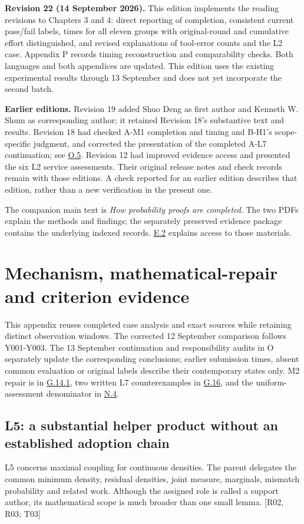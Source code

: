 \textbf{Revision 22 (14 September 2026).} This edition implements the reading revisions to Chapters 3 and 4: direct reporting of completion, consistent current pass/fail labels, times for all eleven groups with original-round and cumulative effort distinguished, and revised explanations of tool-error counts and the L2 case. Appendix P records timing reconstruction and comparability checks. Both languages and both appendices are updated. This edition uses the existing experimental results through 13 September and does not yet incorporate the second batch.

\textbf{Earlier editions.} Revision 19 added Shuo Deng as first author and Kenneth W. Shum as corresponding author; it retained Revision 18's substantive text and results. Revision 18 had checked A-M1 completion and timing and B-H1's scope-specific judgment, and corrected the presentation of the completed A-L7 continuation; see \hyperlink{o5}{O.5}. Revision 12 had improved evidence access and presented the six L2 service assessments. Their original release notes and check records remain with those editions. A check reported for an earlier edition describes that edition, rather than a new verification in the present one.

The companion main text is \emph{How probability proofs are completed}. The two PDFs explain the methods and findings; the separately preserved evidence package contains the underlying indexed records. \hyperlink{e2}{E.2} explains access to those materials.

\section[Mechanism, mathematical-repair and criterion evidence]{\texorpdfstring{\protect\hypertarget{appendix-g}{}Mechanism, mathematical-repair and criterion evidence}{Mechanism, mathematical-repair and criterion evidence}}
This appendix reuses completed case analysis and exact sources while retaining distinct observation windows. The corrected 12 September comparison follows Y001-Y003. The 13 September continuation and responsibility audits in O separately update the corresponding conclusions; earlier submission times, absent common evaluation or original labels describe their contemporary states only. M2 repair is in \hyperlink{g14-1}{G.14.1}, two written L7 counterexamples in \hyperlink{g16}{G.16}, and the uniform-assessment denominator in \hyperlink{n4}{N.4}.

\subsection[L5: a substantial helper product without an established adoption chain]{\texorpdfstring{\protect\hypertarget{g1}{}L5: a substantial helper product without an established adoption chain}{L5: a substantial helper product without an established adoption chain}}
L5 concerns maximal coupling for continuous densities. The parent delegates the common minimum density, residual densities, joint measure, marginals, mismatch probability and related work. Although the assigned role is called a support author, its mathematical scope is much broader than one small lemma. [R02, R03; T03]

